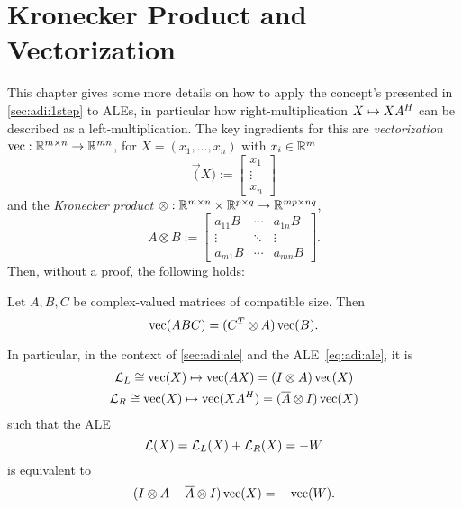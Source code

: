 \chapter{Kronecker Product and Vectorization}
\label{sec:vectorization}

This chapter gives some more details on how to apply the concept's presented in \autoref{sec:adi:1step} to \acp{ALE},
in particular how right-multiplication $X \mapsto XA^H$ can be described as a left-multiplication.
The key ingredients for this are \emph{vectorization} $\operatorname{vec} : \mathbb{R}^{m\times n} \to \mathbb{R}^{mn}$,
\eg for $X=(x_1,\ldots, x_n)$ with $x_i\in\mathbb{R}^m$
\begin{equation}
  \vec(X) := \begin{bmatrix}
    x_1 \\
    \vdots \\
    x_n
  \end{bmatrix}
\end{equation}
and the \emph{Kronecker product} $\otimes : \mathbb{R}^{m\times n} \times \mathbb{R}^{p\times q} \to \mathbb{R}^{mp \times nq}$,
\begin{equation}
  A \otimes B := \begin{bmatrix}
    a_{11} B & \cdots & a_{1n} B \\
    \vdots   & \ddots & \vdots \\
    a_{m1} B & \cdots & a_{mn} B
  \end{bmatrix}
  .
\end{equation}
Then, without a proof, the following holds:

\begin{proposition}
  Let $A, B, C$ be complex-valued matrices of compatible size. Then
  \begin{equation*}
    \operatorname{vec}(ABC) = (C^T \otimes A) \operatorname{vec}(B)
    .
  \end{equation*}
\end{proposition}

In particular, in the context of \autoref{sec:adi:ale}
and the \ac{ALE}~\eqref{eq:adi:ale}, it is
\begin{gather}
  \Lyap_L \cong \vec(X) \mapsto \vec(AX) = (I \otimes A) \vec(X) \\
  \Lyap_R \cong \vec(X) \mapsto \vec(XA^\HT) = (\conj A \otimes I) \vec(X)
\end{gather}
such that the \ac{ALE}
\begin{equation}
  \operatorname{\mathcal L}(X) = \operatorname{\mathcal L}_L(X) + \operatorname{\mathcal L}_R(X) = -W
\end{equation}
is equivalent to
\begin{equation}
  (I \otimes A + \conj A \otimes I) \vec(X) = -\vec(W)
  .
\end{equation}
